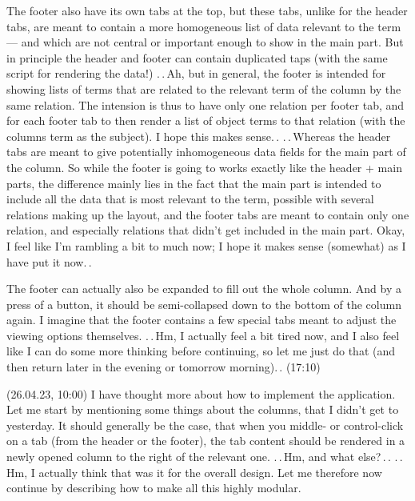 \documentclass{report}
\begin{document}
The footer also have its own tabs at the top, but these tabs, unlike for the header tabs, are meant to contain a more homogeneous list of data relevant to the term --- and which are not central or important enough to show in the main part. But in principle the header and footer can contain duplicated taps (with the same script for rendering the data!) .\,.\,Ah, but in general, the footer is intended for showing lists of terms that are related to the relevant term of the column by the same relation. The intension is thus to have only one relation per footer tab, and for each footer tab to then render a list of object terms to that relation (with the columns term as the subject). I hope this makes sense.\,. .\,.\,Whereas the header tabs are meant to give potentially inhomogeneous data fields for the main part of the column. So while the footer is going to works exactly like the header + main parts, the difference mainly lies in the fact that the main part is intended to include all the data that is most relevant to the term, possible with several relations making up the layout, and the footer tabs are meant to contain only one relation, and especially relations that didn't get included in the main part. Okay, I feel like I'm rambling a bit to much now; I hope it makes sense (somewhat) as I have put it now.\,. %

The footer can actually also be expanded to fill out the whole column. And by a press of a button, it should be semi-collapsed down to the bottom of the column again. I imagine that the footer contains a few special tabs meant to adjust the viewing options themselves. .\,.\,Hm, I actually feel a bit tired now, and I also feel like I can do some more thinking before continuing, so let me just do that (and then return later in the evening or tomorrow morning).\,. (17:10)

(26.04.23, 10:00) I have thought more about how to implement the application. Let me start by mentioning some things about the columns, that I didn't get to yesterday. It should generally be the case, that when you middle- or control-click on a tab (from the header or the footer), the tab content should be rendered in a newly opened column to the right of the relevant one. .\,.\,Hm, and what else?\,.\,. .\,.\,Hm, I actually think that was it for the overall design. Let me therefore now continue by describing how to make all this highly modular.
\end{document}
